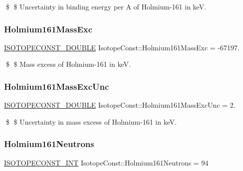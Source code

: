 \$ \$ Uncertainty in binding energy per A of Holmium-\/161 in keV. \mbox{\label{group___isotope_const-_holmium-_ho161_gad1fdb67eb07b258c4175a3cbfb7e2a05}} 
\subsubsection{\texorpdfstring{Holmium161\+Mass\+Exc}{Holmium161MassExc}}
{\footnotesize\ttfamily \mbox{\hyperlink{group___isotope_const-_macros_ga8f45a7272ce02c0b4c65c44636ed719a}{I\+S\+O\+T\+O\+P\+E\+C\+O\+N\+S\+T\+\_\+\+D\+O\+U\+B\+LE}} Isotope\+Const\+::\+Holmium161\+Mass\+Exc = -\/67197.}

\$ \$ Mass excess of Holmium-\/161 in keV. \mbox{\label{group___isotope_const-_holmium-_ho161_ga40bffb7905abea3809c97e0d0ecc8383}} 
\subsubsection{\texorpdfstring{Holmium161\+Mass\+Exc\+Unc}{Holmium161MassExcUnc}}
{\footnotesize\ttfamily \mbox{\hyperlink{group___isotope_const-_macros_ga8f45a7272ce02c0b4c65c44636ed719a}{I\+S\+O\+T\+O\+P\+E\+C\+O\+N\+S\+T\+\_\+\+D\+O\+U\+B\+LE}} Isotope\+Const\+::\+Holmium161\+Mass\+Exc\+Unc = 2.}

\$ \$ Uncertainty in mass excess of Holmium-\/161 in keV. \mbox{\label{group___isotope_const-_holmium-_ho161_ga424176ec71c468ee0f76e88bc2b08a80}} 
\subsubsection{\texorpdfstring{Holmium161\+Neutrons}{Holmium161Neutrons}}
{\footnotesize\ttfamily \mbox{\hyperlink{group___isotope_const-_macros_ga5f18360b3e99483a35c32d789e62621c}{I\+S\+O\+T\+O\+P\+E\+C\+O\+N\+S\+T\+\_\+\+I\+NT}} Isotope\+Const\+::\+Holmium161\+Neutrons = 94}

